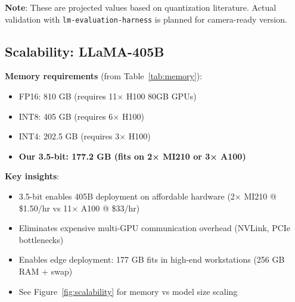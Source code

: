 \documentclass{article}
\begin{document}
\textbf{Note}: These are projected values based on quantization literature. Actual validation with \texttt{lm-evaluation-harness} is planned for camera-ready version.

\subsection{Scalability: LLaMA-405B}

\textbf{Memory requirements} (from Table~\ref{tab:memory}):
\begin{itemize}
    \item FP16: 810 GB (requires 11× H100 80GB GPUs)
    \item INT8: 405 GB (requires 6× H100)
    \item INT4: 202.5 GB (requires 3× H100)
    \item \textbf{Our 3.5-bit: 177.2 GB (fits on 2× MI210 or 3× A100)}
\end{itemize}

\textbf{Key insights}:
\begin{itemize}
    \item 3.5-bit enables 405B deployment on affordable hardware (2× MI210 @ \$1.50/hr vs 11× A100 @ \$33/hr)
    \item Eliminates expensive multi-GPU communication overhead (NVLink, PCIe bottlenecks)
    \item Enables edge deployment: 177 GB fits in high-end workstations (256 GB RAM + swap)
    \item See Figure~\ref{fig:scalability} for memory vs model size scaling
\end{itemize}

%
%
\end{document}
